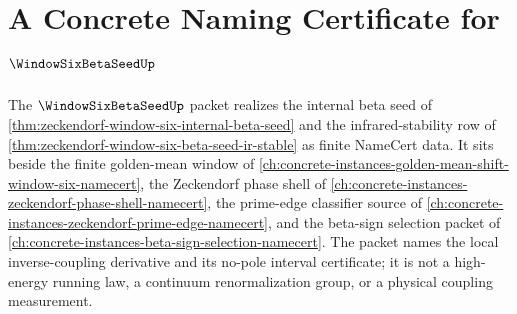 \chapter{A Concrete Naming Certificate for $\WindowSixBetaSeedUp$}
\label{ch:concrete-instances-window-six-beta-seed-namecert}

The $\WindowSixBetaSeedUp$ packet realizes the internal beta seed of \autoref{thm:zeckendorf-window-six-internal-beta-seed} and the infrared-stability row of \autoref{thm:zeckendorf-window-six-beta-seed-ir-stable} as finite NameCert data. It sits beside the finite golden-mean window of \autoref{ch:concrete-instances-golden-mean-shift-window-six-namecert}, the Zeckendorf phase shell of \autoref{ch:concrete-instances-zeckendorf-phase-shell-namecert}, the prime-edge classifier source of \autoref{ch:concrete-instances-zeckendorf-prime-edge-namecert}, and the beta-sign selection packet of \autoref{ch:concrete-instances-beta-sign-selection-namecert}. The packet names the local inverse-coupling derivative and its no-pole interval certificate; it is not a high-energy running law, a continuum renormalization group, or a physical coupling measurement.

